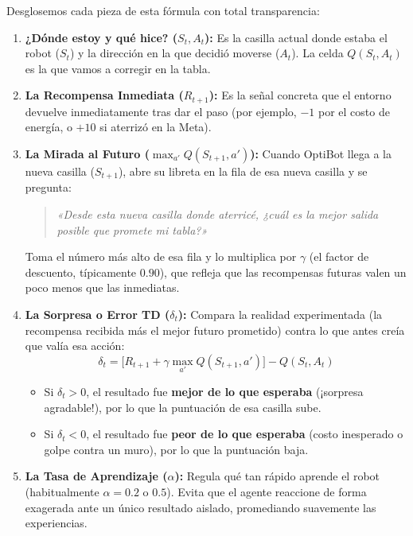 Desglosemos cada pieza de esta fórmula con total transparencia:
\begin{enumerate}
  \item \textbf{¿Dónde estoy y qué hice? ($S_t, A_t$):}
  Es la casilla actual donde estaba el robot ($S_t$) y la dirección en la que decidió moverse ($A_t$). La celda $Q(S_t, A_t)$ es la que vamos a corregir en la tabla.
  
  \item \textbf{La Recompensa Inmediata ($R_{t+1}$):}
  Es la señal concreta que el entorno devuelve inmediatamente tras dar el paso (por ejemplo, $-1$ por el costo de energía, o $+10$ si aterrizó en la Meta).

  \item \textbf{La Mirada al Futuro ($\max_{a'} Q(S_{t+1}, a')$):}
  Cuando OptiBot llega a la nueva casilla ($S_{t+1}$), abre su libreta en la fila de esa nueva casilla y se pregunta:
  \begin{quote}
    \textit{«Desde esta nueva casilla donde aterricé, ¿cuál es la mejor salida posible que promete mi tabla?»}
  \end{quote}
  Toma el número más alto de esa fila y lo multiplica por $\gamma$ (el factor de descuento, típicamente $0.90$), que refleja que las recompensas futuras valen un poco menos que las inmediatas.

  \item \textbf{La Sorpresa o Error TD ($\delta_t$):}
  Compara la realidad experimentada (la recompensa recibida más el mejor futuro prometido) contra lo que antes creía que valía esa acción:
  \begin{equation}
    \delta_t = \Big[ R_{t+1} + \gamma \max_{a'} Q(S_{t+1}, a') \Big] - Q(S_t, A_t)
  \end{equation}
  \begin{itemize}
    \item Si $\delta_t > 0$, el resultado fue \textbf{mejor de lo que esperaba} (¡sorpresa agradable!), por lo que la puntuación de esa casilla sube.
    \item Si $\delta_t < 0$, el resultado fue \textbf{peor de lo que esperaba} (costo inesperado o golpe contra un muro), por lo que la puntuación baja.
  \end{itemize}

  \item \textbf{La Tasa de Aprendizaje ($\alpha$):}
  Regula qué tan rápido aprende el robot (habitualmente $\alpha = 0.2$ o $0.5$). Evita que el agente reaccione de forma exagerada ante un único resultado aislado, promediando suavemente las experiencias.
\end{enumerate}

